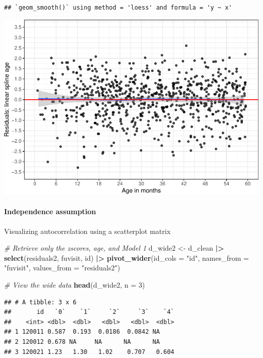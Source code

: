\documentclass[
]{article}
\newenvironment{Shaded}{\begin{snugshade}}{\end{snugshade}}
\newcommand{\AttributeTok}[1]{\textcolor[rgb]{0.13,0.29,0.53}{#1}}
\newcommand{\CommentTok}[1]{\textcolor[rgb]{0.56,0.35,0.01}{\textit{#1}}}
\newcommand{\DecValTok}[1]{\textcolor[rgb]{0.00,0.00,0.81}{#1}}
\newcommand{\FunctionTok}[1]{\textcolor[rgb]{0.13,0.29,0.53}{\textbf{#1}}}
\newcommand{\NormalTok}[1]{#1}
\newcommand{\OtherTok}[1]{\textcolor[rgb]{0.56,0.35,0.01}{#1}}
\newcommand{\SpecialCharTok}[1]{\textcolor[rgb]{0.81,0.36,0.00}{\textbf{#1}}}
\newcommand{\StringTok}[1]{\textcolor[rgb]{0.31,0.60,0.02}{#1}}
\begin{document}
\begin{verbatim}
## `geom_smooth()` using method = 'loess' and formula = 'y ~ x'
\end{verbatim}

\includegraphics{ProblemSet3_ts_1677791812_files/figure-latex/unnamed-chunk-13-1.pdf}

\hypertarget{independence-assumption-1}{%
\paragraph{Independence assumption}\label{independence-assumption-1}}

Visualizing autocorrelation using a scatterplot matrix

\begin{Shaded}
\begin{Highlighting}[]
\CommentTok{\# Retrieve only the zscores, age, and Model 1}
\NormalTok{d\_wide2 }\OtherTok{\textless{}{-}}\NormalTok{ d\_clean }\SpecialCharTok{|\textgreater{}}
  \FunctionTok{select}\NormalTok{(residuals2, fuvisit, id) }\SpecialCharTok{|\textgreater{}}
  \FunctionTok{pivot\_wider}\NormalTok{(}\AttributeTok{id\_cols =} \StringTok{"id"}\NormalTok{,}
              \AttributeTok{names\_from =} \StringTok{"fuvisit"}\NormalTok{,}
              \AttributeTok{values\_from =} \StringTok{"residuals2"}\NormalTok{)}

\CommentTok{\# View the wide data}
\FunctionTok{head}\NormalTok{(d\_wide2, }\AttributeTok{n =} \DecValTok{3}\NormalTok{)}
\end{Highlighting}
\end{Shaded}

\begin{verbatim}
## # A tibble: 3 x 6
##       id   `0`    `1`     `2`     `3`    `4`
##    <int> <dbl>  <dbl>   <dbl>   <dbl>  <dbl>
## 1 120011 0.587  0.193  0.0186  0.0842 NA    
## 2 120012 0.678 NA     NA      NA      NA    
## 3 120021 1.23   1.30   1.02    0.707   0.604
\end{verbatim}
\end{document}
